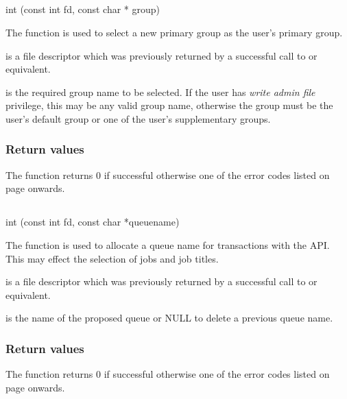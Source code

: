 \subsection{\funcnameXBnewgrp{}}

\begin{expara}

int \funcnameXBnewgrp{}(const int fd, const char * group)

\end{expara}

The function \funcXBnewgrp{} is used to select a new primary group as the user's primary group.

 is a file descriptor which was previously returned by a successful call to \funcXBopen{} or equivalent.

 is the required group name to be selected.
If the user has \textit{write admin file} privilege, this may be any valid group name, otherwise the group must be the
user's default group or one of the user's supplementary groups.

\subsubsection{Return values}
The function returns 0 if successful otherwise one of the error codes listed on page \pageref{errorcodes} onwards.

\subsection{\funcnameXBsetqueue{}}

\begin{expara}

int \funcnameXBsetqueue{}(const int fd, const char *queuename)

\end{expara}

The function \funcXBsetqueue{} is used to allocate a queue name for transactions with the API. This may effect the selection
of jobs and job titles.

 is a file descriptor which was previously returned by a successful call to \funcXBopen{} or equivalent.

 is the name of the proposed queue or NULL to delete a previous queue name.

\subsubsection{Return values}
The function returns 0 if successful otherwise one of the error codes listed on page \pageref{errorcodes} onwards.

